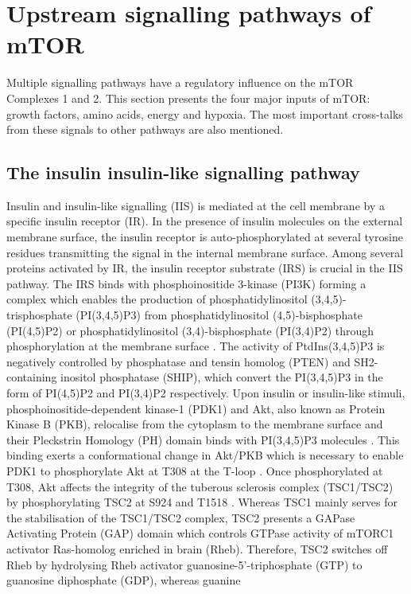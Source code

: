 \section{Upstream signalling pathways of mTOR}
\label{sec:Upstream signalling pathways of mTOR}
Multiple signalling pathways have a regulatory influence on the mTOR Complexes 1 and 2. This section presents the four major inputs of mTOR: growth factors, amino acids, energy and hypoxia. The most important cross-talks from these signals to other pathways are also mentioned.

\subsection{The insulin insulin-like signalling pathway}
\label{subsec:The insulin insulin-like signalling pathway}
Insulin and insulin-like signalling (IIS) is mediated at the cell membrane by a specific insulin receptor (IR). In the presence of insulin molecules on the external membrane surface, the insulin receptor is auto-phosphorylated at several tyrosine residues transmitting the signal in the internal membrane surface. Among several proteins activated by IR, the insulin receptor substrate (IRS) is crucial in the IIS pathway. The IRS binds with phosphoinositide 3-kinase (PI3K) forming a complex which enables the production of  phosphatidylinositol (3,4,5)-trisphosphate (PI(3,4,5)P3) from phosphatidylinositol (4,5)-bisphosphate (PI(4,5)P2) or phosphatidylinositol (3,4)-bisphosphate (PI(3,4)P2) through phosphorylation at the membrane surface \citep{Polak2009}. The activity of PtdIns(3,4,5)P3 is negatively controlled by phosphatase and tensin homolog (PTEN) and SH2-containing inositol phosphatase (SHIP), which convert the PI(3,4,5)P3 in the form of PI(4,5)P2 and PI(3,4)P2 respectively. Upon insulin or insulin-like 
stimuli, phosphoinositide-dependent kinase-1 (PDK1) and Akt, also known as Protein Kinase B (PKB), relocalise from the cytoplasm to the membrane surface and their Pleckstrin Homology (PH) domain binds with PI(3,4,5)P3 molecules \citep{Polak2009}. This binding exerts a conformational change in Akt/PKB which is necessary to enable PDK1 to phosphorylate Akt at T308 at the T-loop \citep{Kobayashi2008, Alessi2004b, Kobayashi1999, Alessi2008, Alessi2004, Toker2000, Biondi2004}. Once phosphorylated at T308, Akt affects the integrity of the tuberous sclerosis complex (TSC1/TSC2) by phosphorylating TSC2 at S924 and T1518 \citep{Inoki2002, Potter2002}. Whereas TSC1 mainly serves for the stabilisation of the TSC1/TSC2 complex, TSC2 presents a GAPase Activating Protein (GAP) domain which controls GTPase activity of mTORC1 activator Ras-homolog enriched in brain (Rheb). Therefore, TSC2 switches off Rheb by hydrolysing Rheb activator guanosine-5'-triphosphate (GTP) to guanosine diphosphate (GDP), whereas guanine 
